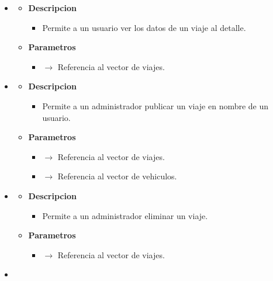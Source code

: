 \begin{itemize}
    \item{}
    \begin{itemize}
        \item \textbf{Descripcion}
        \begin{itemize}
			\item  Permite a un usuario ver los datos de un viaje al detalle.
		\end{itemize}
		\item \textbf{Parametros}
		\begin{itemize}
			\item {}  $\rightarrow$ Referencia al vector de viajes.
		\end{itemize}
	\end{itemize}
    \newpage
    \item {}
    \begin{itemize}
        \item \textbf{Descripcion}
        \begin{itemize}
			\item Permite a un administrador publicar un viaje en nombre de un usuario.
		\end{itemize}
		\item \textbf{Parametros}
		\begin{itemize}
			\item {}  $\rightarrow$ Referencia al vector de viajes.
            \item {} $\rightarrow$ Referencia al vector de vehiculos.
		\end{itemize}
	\end{itemize}
    \item {}
    \begin{itemize}
        \item \textbf{Descripcion}
        \begin{itemize}
			\item  Permite a un administrador eliminar un viaje.
		\end{itemize}
		\item \textbf{Parametros}
		\begin{itemize}
			\item {}  $\rightarrow$ Referencia al vector de viajes.
		\end{itemize}
	\end{itemize}
    \item {}

\end{itemize}
